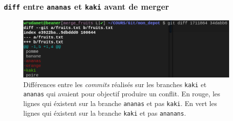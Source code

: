 \documentclass[table,tikz,12pt,svgnames]{beamer}
\begin{document}
\begin{frame}
\frametitle{\texttt{diff} entre \texttt{ananas} et \texttt{kaki} avant de merger}
\begin{adjustwidth}{-0.8cm}{-0.8cm}{}
	\begin{figure}
		\centering
		\includegraphics[scale=0.35]{images/git_diff_conflict.png}
		{Différences entre les \textit{commits} réalisés sur les branches \texttt{kaki} et \texttt{ananas} qui avaient pour objectif produire un conflit. En {\color{red}rouge}, les lignes qui éxistent sur la branche \texttt{ananas} et pas \texttt{kaki}. En {\color{green}vert} les lignes qui éxistent sur la branche \texttt{kaki} et pas \texttt{ananans}.}
		\label{figure:example}
	\end{figure}
\end{adjustwidth}
\end{frame}

\end{document}
